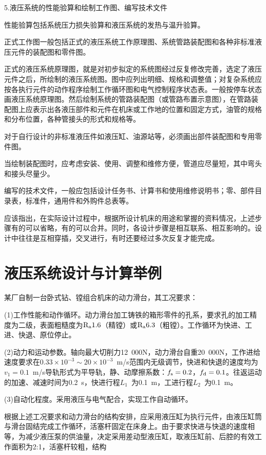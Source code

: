  5.液压系统的性能验算和绘制工作图、编写技术文件

 性能验算包括系统压力损失验算和液压系统的发热与温升验算。

 正式工作图一般包括正式的液压系统工作原理图、系统管路装配图和各种非标准液压元件的装配图和零件图。

 正式的液压系统原理图，就是对初步拟定的系统图经过反复修改完善，选定了液压元件之后，所绘制的液压系统图。图中应列出明细、规格和调整值；对复杂系统应按各执行元件的动作程序绘制工作循环图和电气控制程序状态表。一般按停车状态画液压系统原理图。然后绘制系统的管路装配图（或管路布置示意图），在管路装配图上应表示出各液压部件和元件在机床或工作地的位置和固定方式，油管的规格和分布位置，各种管接头的形式和规格等。

 对于自行设计的非标准液压件如液压缸、油源站等，必须画出部件装配图和专用零件图。

 当绘制装配图时，应考虑安装、使用、调整和维修方便，管道应尽量短，其中弯头和接头尽量少。

 编写的技术文件，一般应包括设计任务书、计算书和使用维修说明书；零、部件目录表，标准件，通用件和外购件总表等。

 应该指出，在实际设计过程中，根据所设计机床的用途和掌握的资料情况，上述步骤有的可以省略，有的可以合并。同时，各设计步骤是相互联系、相互影响的。设计中往往是互相穿插，交叉进行，有时还要经过多次反复才能完成。


\section{液压系统设计与计算举例}

某厂自制一台卧式钻、镗组合机床的动力滑台，其工况要求：

(1)工作性能和动作循环。动力滑台加工铸铁的箱形零件的孔系，要求孔的加工精度为二级，表面粗糙度为$\rm{R_a1.6}$（精镗）或$\rm{R_a6.3}$（粗镗）。工作循环为快进、工进、快退、原位停止。

(2)动力和运动参数。轴向最大切削力12\ 000N，动力滑台自重20\ 000N，工作进给速度要求在$0.33×10^{-3}\sim 20×10^{-3}$\ m/s范围内无级调节，快进和快退的速度均为$v_1=0.1$\ m/s导轨形式为平导轨，静、动摩擦系数：$f_{\rm{s}}=0.2$，$f_{\rm{d}}=0.1$。往返运动的加速、减速时间为0.2\ s，快进行程$L_1$\ 为0.1\ m，工进行程$L_2$\ 为0.1\ m。

(3)自动化程度。采用液压与电气配合，实现工作自动循环。

根据上述工况要求和动力滑台的结构安排，应采用液压缸为执行元件，由液压缸筒与滑台固结完成工作循环，活塞杆固定在床身上。由于要求快进与快退的速度相等，为减少液压泵的供油量，决定采用差动型液压缸，取液压缸前、后腔的有效工作面积为2:1，活塞杆较粗，结构